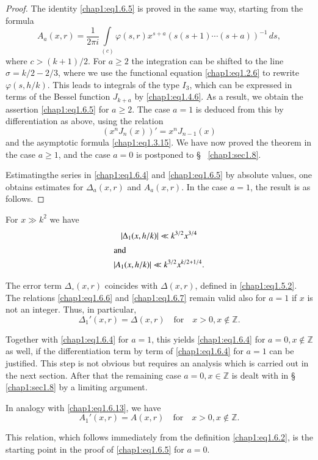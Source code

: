 \begin{proof}
The identity \eqref{chap1:eq1.6.5} is proved in the same way, starting
from the formula
$$
A_a(x,r)=\frac{1}{2\pi i}\int\limits_{(c)}\varphi(s,r)x^{s+a}
(s(s+1)\cdots (s+a))^{-1}\,ds,
$$
where $c>(k+1)/2$. For $a\geq 2$ the integration can be shifted
to the line $\sigma = k/2-2/3$, where we use the functional
equation \eqref{chap1:eq1.2.6} to rewrite $\varphi(s,h/k)$. This leads
to integrals of the type $I_3$, which can be expressed in terms of the
Bessel function $J_{k+a}$ by \eqref{chap1:eq1.4.6}. As a result,
we obtain the assertion \eqref{chap1:eq1.6.5} for $a\geq 2$. The case
$a=1$ is deduced from this by differentiation as above, using the
relation 
\begin{equation}\label{chap1:eq1.6.10}
(x^nJ_n(x))'=x^nJ_{n-1}(x)
\end{equation}
and the asymptotic formula \eqref{chap1:eq1.3.15}. We have now proved
the theorem in the case $a\geq 1$, and the case $a=0$ is postponed to
\S~ \ref{chap1:sec1.8}. 

Estimating\pageoriginale the series in \eqref{chap1:eq1.6.4} and
\eqref{chap1:eq1.6.5} by absolute values, one obtains estimates for
$\Delta_a(x,r)$ and $A_a(x,r)$. In the case $a=1$, the result is as
follows. 
\end{proof}

\begin{Coro*}
For $x\gg k^2$ we have
\begin{gather}
|\Delta_1(x,h/k)|\ll k^{3/2}x^{3/4}\label{chap1:eq1.6.11}\\
\intertext{and}
|A_1(x,h/k)|\ll k^{3/2}x^{k/2+1/4}.\label{chap1:eq1.6.12}
\end{gather}
\end{Coro*}

\begin{REM*}
The error term $\Delta_\circ(x,r)$ coincides with $\Delta(x,r)$,
defined in \eqref{chap1:eq1.5.2}. The relations \eqref{chap1:eq1.6.6}
and \eqref{chap1:eq1.6.7} remain valid also for $a=1$ if $x$ is not an
integer. Thus, in particular,
\begin{equation}\label{chap1:eq1.6.13}
\Delta_1'(x,r)=\Delta(x,r)\quad\text{for}\quad x>0,x\notin\mathbb{Z}. 
\end{equation}

Together with \eqref{chap1:eq1.6.4} for $a=1$, this yields
\eqref{chap1:eq1.6.4} for $a=0, x\notin\mathbb{Z}$ as well, if the
differentiation term by term of \eqref{chap1:eq1.6.4} for $a=1$ can be
justified. This step is not obvious but requires an analysis which is
carried out in the next section. After that the remaining case
$a=0,x\in\mathbb{Z}$ is dealt with in \S~ \ref{chap1:sec1.8} by a
limiting argument.

In analogy with \eqref{chap1:eq1.6.13}, we have 
\begin{equation}\label{chap1:eq1.6.14}
A_1'(x,r)=A(x,r)\quad\text{for}\quad x>0, x\notin \mathbb{Z}.
\end{equation}

This relation, which follows immediately from the definition
\eqref{chap1:eq1.6.2}, is the starting point in the proof of
\eqref{chap1:eq1.6.5} for $a=0$.
\end{REM*}

